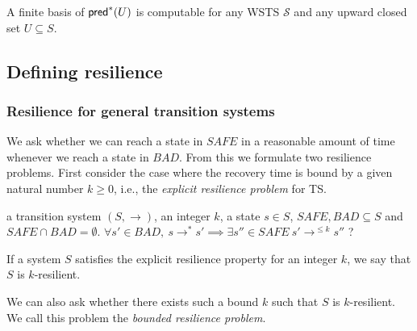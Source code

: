 \begin{theorem}
A finite basis of $ \textsf{pred}^*(U)$ is computable for any WSTS $\mathscr{S}$ and any upward closed set $U \subseteq S$.
\end{theorem}

\iffalse
\subsection{Defining resilience}


\subsubsection{Resilience for general transition systems}


We ask whether we can reach a state 
in 
%
$SAFE$  in a reasonable amount of time whenever we reach a state 
in
%
$BAD$. 
From this we formulate two resilience problems. First consider the case where the recovery time
is bound by a given natural number $k \geq 0$, i.e., the \emph{explicit resilience problem} for TS.

{a transition system $(S,\rightarrow)$, an integer $k$, a state $s \in S$, $SAFE, BAD \subseteq S$ and $SAFE \cap BAD = \emptyset$.}
{$\forall s' \in BAD, ~ s \rightarrow^* s' \implies \exists s'' \in SAFE ~ s' \rightarrow^{\leq k} s''$ ?\newline}

If a system $S$ satisfies the explicit resilience property for an integer $k$, we say that $S$ is $k$-resilient.


We can also ask whether there exists such a bound $k$ such that $S$ is $k$-resilient. We call this problem the \emph{bounded resilience problem}.

%
%


